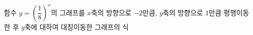 함수 $y=\left(\dfrac{1}{8}\right)^{x}$의 그래프를 $x$축의 방향으로 $-2$만큼, $y$축의 방향으로 $1$만큼 평행이동한 후 $y$축에 대하여 대칭이동한 그래프의 식
